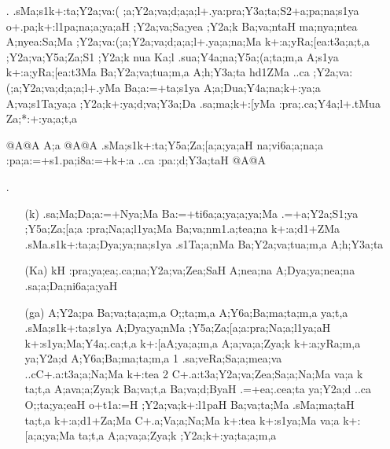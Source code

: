 \begin{spacing}{1.15}
\begin{itemize}
\begin{itemize}
    \end{itemize}
 
 \item[{\sktf 9}.] {\sktf .sMa;s1k+:ta\ZF{-};Y2a;va:(%
;a;Y2a;va;d;a;a;l+.ya\ZF{-}:pra;Y3a;ta;S2+a;pa;na;s1ya
o+.pa;k+:l1pa;na;a;ya;aH ;Y2a;va;Sa;yea ;Y2a;k
Ba;va;ntaH ma;nya;ntea  A{;nyea}:Sa;Ma {;Y2a;va}:(;a;Y2a;va;d;a;a;l+.ya;a;na;Ma
k+:a;yRa;[ea:t3a;a;t,a ;Y2a;va;Y5a;Za;S1 ;Y2a;k nua
Ka;l .sua;Y4a;na;Y5a;(a;ta;m,a A;s1ya k+:a;yRa;[ea:t3Ma
Ba;Y2a;va;tua;m,a A;h;Y3a;ta  {h}d1}{\sktf ZMa} {\sktf ..ca ;Y2a;va:(;a;Y2a;va;d;a;a;l+.yMa
Ba;a:=+ta;s1ya A;a;Dua;Y4a;na;k+:ya;a A;va;s1Ta;ya;a ;Y2a;k+:ya;d;va;Y3a;Da
.sa;ma;k+:[yMa :pra;.ca;Y4a;l+.tMua Za;*:+:ya;a;t,a } 
   
 {\sktb {}@A@A A;a @A@A .sMa;s1k+:ta;Y5a;Za;[a;a;ya;aH na;vi6a;a;na;a
:pa;a:=+s1.pa;i8a:=+k+:a ..ca :pa:;d;Y3a;taH%
 @A@A}


\item[{\sktf 10 }.] \begin{itemize}
   \item[({\sktf k})] {\sktf .sa;Ma;Da;a:=+Nya;Ma Ba:=+ti6a;a;ya;a;ya;Ma
.=+a;Y2a;S1;ya ;Y5a;Za;[a;a :pra;Na;a;l1ya;Ma
Ba;va;nm1.a;tea;na k+:a;d1+ZMa {.sMa}.s1k+:ta;a;Dya;ya;na;s1ya .s1Ta;a;nMa Ba;Y2a;va;tua;m,a
A;h;Y3a;ta }
            
   \item[({\sktf Ka})] {\sktf kH :pra;ya;ea;.ca;na;Y2a;va;Zea;SaH%
 A;nea;na A;Dya;ya;nea;na .sa;a;Da;ni6a;a;yaH }
            
    \item[({\sktf ga})] {\sktf A;Y2a;pa Ba;va;ta;a;m,a O;;ta;m,a
A;Y6a;Ba;ma;ta;m,a\ZF{,} ya;t,a .sMa;s1k+:ta;s1ya
A;Dya;ya;nMa ;Y5a;Za;[a;a\ZF{-}:pra;Na;a;l1ya;aH k+:s1ya;Ma;Y4a;.ca;t,a
k+:[aA;ya;a;m,a A;a;va;a;Zya;k k+:a;yRa;m,a 
ya;Y2a;d A;Y6a;Ba;ma;ta;m,a\ZF{,} \ZF{(}1\ZF{)} .sa;veRa;Sa;a;mea;va
..cC+.a:t3a;a;Na;Ma k+:tea\ZF{,} \ZF{(}2\ZF{)}
C+.a:t3a;Y2a;va;Zea;Sa;a;Na;Ma va;a k\ZF{,} ta;t,a A;ava;a;Zya;k Ba;va;t,a\ZF{,} Ba;va;d;ByaH
.=+ea;.cea;ta  ya;Y2a;d ..ca O;;ta;ya;eaH o+t1a:=H
;Y2a;va;k+:l1paH Ba;va;ta;Ma .sMa;ma;taH\ZF{,} ta;t,a
k+:a;d1+Za;Ma C+.a;Va;a;Na;Ma k+:tea\ZF{,} k+:s1ya;Ma va;a k+:[a;a;ya;Ma\ZF{,} ta;t,a
A;a;va;a;Zya;k ;Y2a;k+:ya;ta;a;m,a
} 
            

\end{itemize}
\end{itemize}
\end{spacing}
